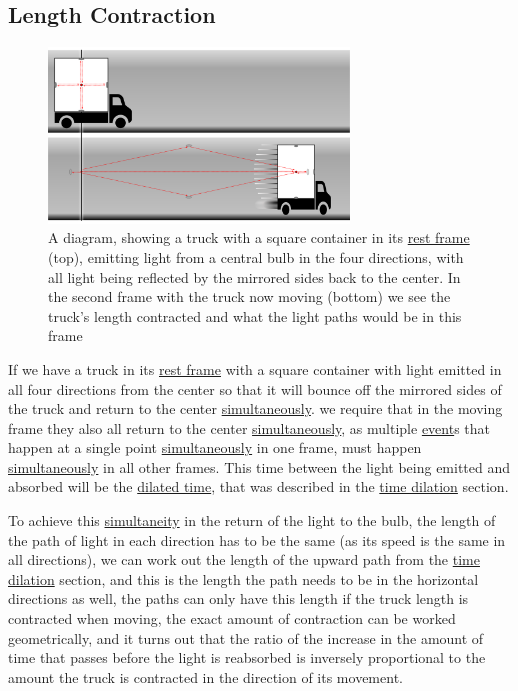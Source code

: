 \subsection{Length Contraction}

\begin{figure}[H]
	\centering
	\includegraphics[width=8cm]{images/pdf/Full_Lorry_Transform.pdf}
	\caption{A diagram, showing a truck with a square container in its \protect\hyperlink{def-proper-frame}{rest frame} (top), emitting light from a central bulb in the four directions, with all light being reflected by the mirrored sides back to the center. In the second frame with the truck now moving (bottom) we see the truck's length contracted and what the light paths would be in this frame}
	\label{fig: full truck transform}
\end{figure}

If we have a truck in its \hyperlink{def-proper-frame}{rest frame} with a square container with light emitted in all four directions from the center so that it will bounce off the mirrored sides of the truck and return to the center \hyperlink{def-simultaneity}{simultaneously}. we require that in the moving frame they also all return to the center \hyperlink{def-simultaneity}{simultaneously}, as multiple \hyperlink{def-event}{event}s that happen at a single point \hyperlink{def-simultaneity}{simultaneously} in one frame, must happen \hyperlink{def-simultaneity}{simultaneously} in all other frames. This time between the light being emitted and absorbed will be the \hyperlink{def-time-dilation}{dilated time}, that was described in the \hyperlink{def-time-dilation}{time dilation} section.

To achieve this \hyperlink{def-simultaneity}{simultaneity} in the return of the light to the bulb, the length of the path of light in each direction has to be the same (as its speed is the same in all directions), we can work out the length of the upward path from the \hyperlink{def-time-dilation}{time dilation} section, and this is the length the path needs to be in the horizontal directions as well, the paths can only have this length if the truck length is contracted when moving, the exact amount of contraction can be worked geometrically, and it turns out that the ratio of the increase in the amount of time that passes before the light is reabsorbed is inversely proportional to the amount the truck is contracted in the direction of its movement.

